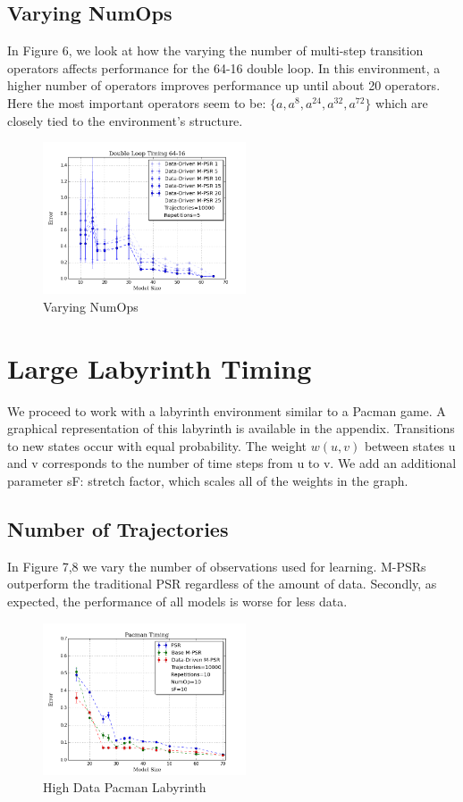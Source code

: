 \subsection{Varying NumOps}

In Figure 6, we look at how the varying the number of multi-step transition operators affects performance for the 64-16 double loop. In this environment, a higher number of operators improves performance up until about 20 operators. Here the most important operators seem to be: $\{a,a^{8},a^{24},a^{32},a^{72}\}$ which are closely tied to the environment's structure.

\begin{figure}[ht!]
\centering
\includegraphics[width=60mm]{uCOREPICS/DL/numOpsTiming.png}
\caption{Varying NumOps\label{overflow}}
\end{figure} 

\section{Large Labyrinth Timing}

We proceed to work with a labyrinth environment similar to a Pacman game. A graphical representation of this labyrinth is available in the appendix. Transitions to new states occur with equal probability. The weight $w(u,v)$ between states u and v corresponds to the number of time steps from u to v. We add an additional parameter sF: stretch factor, which scales all of the weights in the graph. 

\subsection{Number of Trajectories}

In Figure 7,8 we vary the number of observations used for learning. M-PSRs outperform the traditional PSR regardless of the amount of data. Secondly, as expected, the performance of all models is worse for less data.

\begin{figure}[ht!]
\centering
\includegraphics[width=60mm]{uCOREPICS/Pacman/Pacman10k.png}
\caption{High Data Pacman Labyrinth\label{overflow}}
\end{figure}

